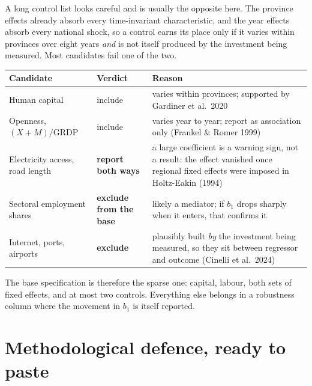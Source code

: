 \documentclass[11pt,a4paper]{article}
\begin{document}
A long control list looks careful and is usually the opposite here. The province effects already
absorb every time-invariant characteristic, and the year effects absorb every national shock, so
a control earns its place only if it varies within provinces over eight years \emph{and} is not
itself produced by the investment being measured. Most candidates fail one of the two.

\begin{center}
\small
\begin{tabular}{@{}p{4.6cm}p{4.0cm}p{6.2cm}@{}}
\toprule
\textbf{Candidate} & \textbf{Verdict} & \textbf{Reason} \\
\midrule
Human capital & include & varies within provinces; supported by Gardiner et al.\ 2020 \\
Openness, $(X{+}M)/\text{GRDP}$ & include & varies year to year; report as association only
(Frankel \& Romer 1999) \\
Electricity access, road length & \textbf{report both ways} & a large coefficient is a warning
sign, not a result: the effect vanished once regional fixed effects were imposed in
Holtz-Eakin (1994) \\
Sectoral employment shares & \textbf{exclude from the base} & likely a mediator; if $b_1$ drops
sharply when it enters, that confirms it \\
Internet, ports, airports & \textbf{exclude} & plausibly built \emph{by} the investment being
measured, so they sit between regressor and outcome (Cinelli et al.\ 2024) \\
\bottomrule
\end{tabular}
\end{center}

The base specification is therefore the sparse one: capital, labour, both sets of fixed effects,
and at most two controls. Everything else belongs in a robustness column where the movement in
$b_1$ is itself reported.

\section{Methodological defence, ready to paste}
\end{document}
